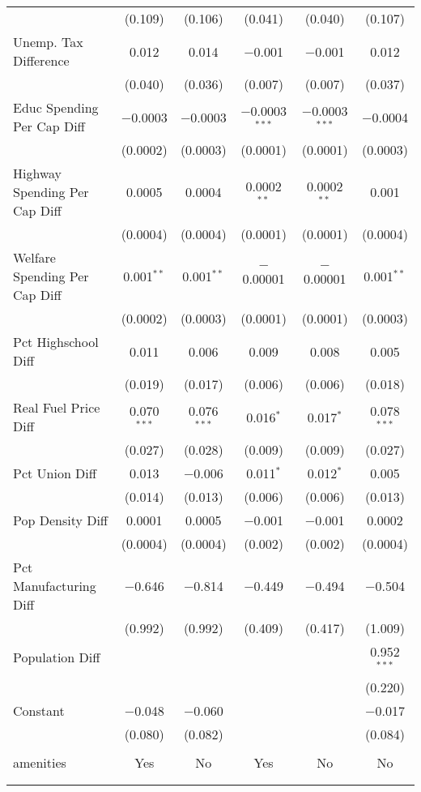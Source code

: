\begin{table}[!htbp]
\begin{tabular}{@{\extracolsep{5pt}}lccccc}
  & (0.109) & (0.106) & (0.041) & (0.040) & (0.107) \\ 
  Unemp. Tax Difference & 0.012 & 0.014 & $-$0.001 & $-$0.001 & 0.012 \\ 
  & (0.040) & (0.036) & (0.007) & (0.007) & (0.037) \\ 
  Educ Spending Per Cap Diff & $-$0.0003 & $-$0.0003 & $-$0.0003$^{***}$ & $-$0.0003$^{***}$ & $-$0.0004 \\ 
  & (0.0002) & (0.0003) & (0.0001) & (0.0001) & (0.0003) \\ 
  Highway Spending Per Cap Diff & 0.0005 & 0.0004 & 0.0002$^{**}$ & 0.0002$^{**}$ & 0.001 \\ 
  & (0.0004) & (0.0004) & (0.0001) & (0.0001) & (0.0004) \\ 
  Welfare Spending Per Cap Diff & 0.001$^{**}$ & 0.001$^{**}$ & $-$0.00001 & $-$0.00001 & 0.001$^{**}$ \\ 
  & (0.0002) & (0.0003) & (0.0001) & (0.0001) & (0.0003) \\ 
  Pct Highschool Diff & 0.011 & 0.006 & 0.009 & 0.008 & 0.005 \\ 
  & (0.019) & (0.017) & (0.006) & (0.006) & (0.018) \\ 
  Real Fuel Price Diff & 0.070$^{***}$ & 0.076$^{***}$ & 0.016$^{*}$ & 0.017$^{*}$ & 0.078$^{***}$ \\ 
  & (0.027) & (0.028) & (0.009) & (0.009) & (0.027) \\ 
  Pct Union Diff & 0.013 & $-$0.006 & 0.011$^{*}$ & 0.012$^{*}$ & 0.005 \\ 
  & (0.014) & (0.013) & (0.006) & (0.006) & (0.013) \\ 
  Pop Density Diff & 0.0001 & 0.0005 & $-$0.001 & $-$0.001 & 0.0002 \\ 
  & (0.0004) & (0.0004) & (0.002) & (0.002) & (0.0004) \\ 
  Pct Manufacturing Diff & $-$0.646 & $-$0.814 & $-$0.449 & $-$0.494 & $-$0.504 \\ 
  & (0.992) & (0.992) & (0.409) & (0.417) & (1.009) \\ 
  Population Diff &  &  &  &  & 0.952$^{***}$ \\ 
  &  &  &  &  & (0.220) \\ 
  Constant & $-$0.048 & $-$0.060 &  &  & $-$0.017 \\ 
  & (0.080) & (0.082) &  &  & (0.084) \\ 
 \hline \\[-1.8ex] 
amenities & Yes & No & Yes & No & No \\ 
\hline \\[-1.8ex] 
\hline 
\hline \\[-1.8ex] 
\end{tabular} 
\end{table} 
